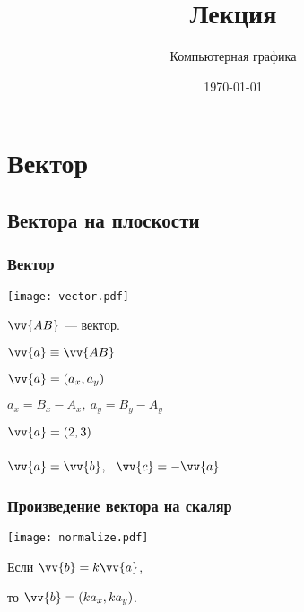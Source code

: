 \documentclass[10pt]{beamer}
\date{\today}
\title{Лекция \lecdni \\ \LectionTheme}
\subtitle{Компьютерная графика}
\begin{document}
	 

    
    \QRFRAME
	
	
	\frame{\maketitle}
	


	
	\begin{frame}
		\tableofcontents
	\end{frame}
	
	\section{Вектор}
	\subsection{Вектора на плоскости}
	
	\frame{\sectionpage}
	
    \begin{frame}\frametitle{Вектор}
    {   
    	\TC{0.55}
    	{
    		 
			\texttt{[image: vector.pdf]}
    		

    	}
    	{
    		$\vv{AB}$ --- вектор.
    		
    		$ \vv{a} \equiv \vv{AB}$
    		
    		$\vv{a} = (a_x, a_y) $
    		
    		$a_x = B_x - A_x, \ a_y = B_y - A_y$
    		
	     	\hfill
	     	
	     	$\vv{a} = (2, 3)$	 \\  ~ \\
	     	
	     	$\vv{a\mathstrut} = \vv{b\mathstrut}$, \ $\vv{c\mathstrut} = -\vv{a\mathstrut}$
	     	
              
    		
    	}

    }
	\end{frame}
    
    \begin{frame}\frametitle{Произведение вектора на скаляр}
    {
    	{
    		
			\texttt{[image: normalize.pdf]}
    		
    		
    	}
    	{
    		Если $\vv{b} = k\vv{a}$, 
    		
    		\hfill
    		
    		то $\vv{b}  = (ka_x, ka_y)$.
    		

    		
    		
    	}
    	
    }
	\end{frame}
    
\end{document}
